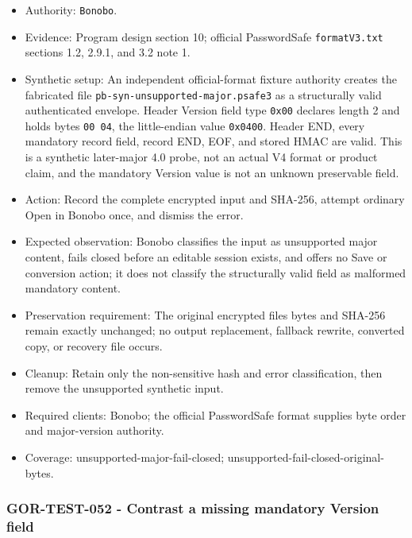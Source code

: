 \documentclass[
  letterpaper,
]{article}
\newcommand{\passthrough}[1]{#1}
\providecommand{\tightlist}{%
  \setlength{\itemsep}{0pt}\setlength{\parskip}{0pt}}
\begin{document}
\begin{itemize}
\tightlist
\item
  Authority: \passthrough{\lstinline!Bonobo!}.
\item
  Evidence: Program design section 10; official PasswordSafe \nolinkurl{formatV3.txt} sections 1.2, 2.9.1, and 3.2 note
  1.
\item
  Synthetic setup: An independent official-format fixture authority creates the fabricated file
  \nolinkurl{pb-syn-unsupported-major.psafe3} as a structurally valid authenticated envelope. Header Version field type
  \passthrough{\lstinline!0x00!} declares length 2 and holds bytes \passthrough{\lstinline!00 04!}, the little-endian
  value \passthrough{\lstinline!0x0400!}. Header END, every mandatory record field, record END, EOF, and stored HMAC are
  valid. This is a synthetic later-major 4.0 probe, not an actual V4 format or product claim, and the mandatory Version
  value is not an unknown preservable field.
\item
  Action: Record the complete encrypted input and SHA-256, attempt ordinary Open in Bonobo once, and dismiss the error.
\item
  Expected observation: Bonobo classifies the input as unsupported major content, fails closed before an editable
  session exists, and offers no Save or conversion action; it does not classify the structurally valid field as
  malformed mandatory content.
\item
  Preservation requirement: The original encrypted file\textquotesingle s bytes and SHA-256 remain exactly unchanged; no
  output replacement, fallback rewrite, converted copy, or recovery file occurs.
\item
  Cleanup: Retain only the non-sensitive hash and error classification, then remove the unsupported synthetic input.
\item
  Required clients: Bonobo; the official PasswordSafe format supplies byte order and major-version authority.
\item
  Coverage: unsupported-major-fail-closed; unsupported-fail-closed-original-bytes.
\end{itemize}

\subsubsection{GOR-TEST-052 - Contrast a missing mandatory Version
field}\label{gor-test-052---contrast-a-missing-mandatory-version-field}
\end{document}
